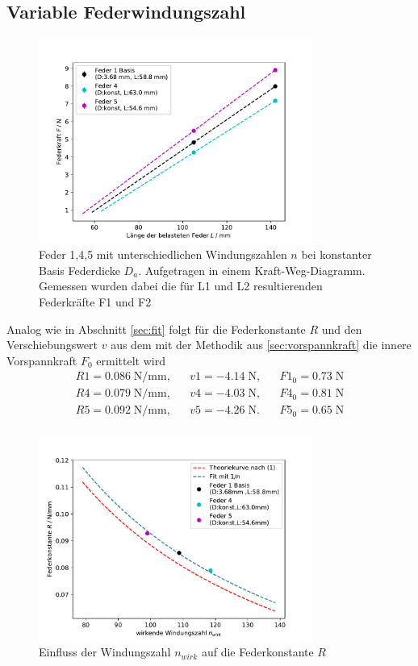 \subsection{Variable Federwindungszahl}
\begin{figure}[H]
    \center
    \includegraphics[width=0.8\textwidth]{plots/n_kraftweg_dia.pdf}
    \caption{Feder 1,4,5 mit unterschiedlichen Windungszahlen $n$ bei konstanter Basis Federdicke $D_a$.
    Aufgetragen in einem Kraft-Weg-Diagramm. Gemessen wurden dabei die für L1
    und L2 resultierenden Federkräfte F1 und F2}
\end{figure}
Analog wie in Abschnitt \ref{sec:fit} folgt für die Federkonstante $R$
und den Verschiebungswert $v$ aus dem mit der Methodik aus \ref{sec:vorspannkraft}
die innere Vorspannkraft $F_0$ ermittelt wird
\begin{align*}
  R1= 0.086\;\si{\N\per\mm}, &&  v1= -4.14\;\si{\N}, && F1_0=0.73\;\si{\N}\\
  R4= 0.079\;\si{\N\per\mm}, &&  v4= -4.03\;\si{\N}, && F4_0=0.81\;\si{\N}\\
  R5= 0.092\;\si{\N\per\mm}, &&  v5= -4.26\;\si{\N}. && F5_0=0.65\;\si{\N}\\
\end{align*}

\begin{figure}[H]
  \center
  \includegraphics[width=0.8\textwidth]{plots/n_konstante_dia.pdf}
  \caption{Einfluss der Windungszahl $n_{wirk}$ auf die Federkonstante $R$}
  \label{fig:R_n_dia}
\end{figure}

